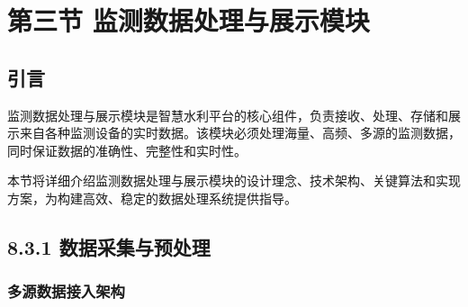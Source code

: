 \section{第三节
监测数据处理与展示模块}\label{ux7b2cux4e09ux8282-ux76d1ux6d4bux6570ux636eux5904ux7406ux4e0eux5c55ux793aux6a21ux5757}

\subsection{引言}\label{ux5f15ux8a00}

监测数据处理与展示模块是智慧水利平台的核心组件，负责接收、处理、存储和展示来自各种监测设备的实时数据。该模块必须处理海量、高频、多源的监测数据，同时保证数据的准确性、完整性和实时性。

本节将详细介绍监测数据处理与展示模块的设计理念、技术架构、关键算法和实现方案，为构建高效、稳定的数据处理系统提供指导。

\subsection{8.3.1
数据采集与预处理}\label{ux6570ux636eux91c7ux96c6ux4e0eux9884ux5904ux7406}

\subsubsection{多源数据接入架构}\label{ux591aux6e90ux6570ux636eux63a5ux5165ux67b6ux6784}

